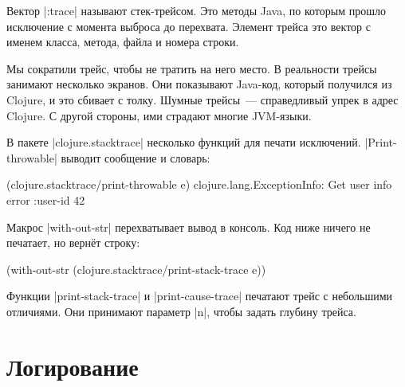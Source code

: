 \begin{english}
\end{english}

Вектор \spverb|:trace| называют стек-трейсом. Это методы Java, по которым прошло
исключение с момента выброса до перехвата. Элемент трейса это вектор с именем
класса, метода, файла и номера строки.

Мы сократили трейс, чтобы не тратить на него место. В реальности трейсы занимают
несколько экранов. Они показывают Java-код, который получился из Clojure, и это
сбивает с толку. Шумные трейсы~--- справедливый упрек в адрес Clojure. С другой
стороны, ими страдают многие JVM-языки.

В пакете \spverb|clojure.stacktrace| несколько функций для печати
исключений. \spverb|Print-throwable| выводит сообщение и словарь:

\begin{english}
  \begin{clojure}
(clojure.stacktrace/print-throwable e)
clojure.lang.ExceptionInfo: Get user info error
{:user-id 42}
  \end{clojure}
\end{english}

Макрос \spverb|with-out-str| перехватывает вывод в консоль. Код ниже ничего не
печатает, но верн\"{е}т строку:

\begin{english}
  \begin{clojure}
(with-out-str
  (clojure.stacktrace/print-stack-trace e))
  \end{clojure}
\end{english}

Функции \spverb|print-stack-trace| и \spverb|print-cause-trace| печатают трейс с
небольшими отличиями. Они принимают параметр \spverb|n|, чтобы задать глубину
трейса.

\section{Логирование}

